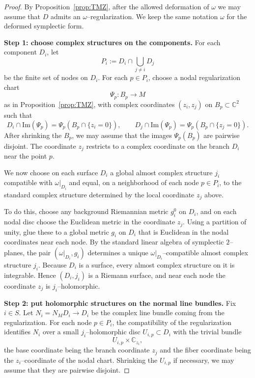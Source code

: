 \documentclass[11pt]{article}
\theoremstyle{remark}
\newcommand{\CC}{\mathbb{C}}
\begin{document}
\begin{proof}
By Proposition~\ref{prop:TMZ}, after the allowed deformation of $\omega$ we may assume
that $D$ admits an $\omega$--regularization.
We keep the same notation $\omega$ for the deformed symplectic form.

\medskip
\noindent\textbf{Step 1: choose complex structures on the components.}
For each component $D_i$, let
\[
P_i:= D_i\cap \bigcup_{j\neq i} D_j
\]
be the finite set of nodes on $D_i$.
For each $p\in P_i$, choose a nodal regularization chart
\[
\Psi_p\colon B_p\to M
\]
as in Proposition~\ref{prop:TMZ}, with complex coordinates $(z_i,z_j)$ on
$B_p\subset\CC^2$ such that
\[
D_i\cap \mathrm{Im}(\Psi_p)=\Psi_p(B_p\cap\{z_i=0\}),\qquad
D_j\cap \mathrm{Im}(\Psi_p)=\Psi_p(B_p\cap\{z_j=0\}).
\]
After shrinking the $B_p$, we may assume that the images $\Psi_p(B_p)$ are pairwise disjoint.
The coordinate $z_j$ restricts to a complex coordinate on the branch $D_i$
near the point $p$.

We now choose on each surface $D_i$ a global almost complex structure $j_i$
compatible with $\omega|_{D_i}$ and equal, on a neighborhood of each node
$p\in P_i$, to the standard complex structure determined by the local coordinate
$z_j$ above.

To do this, choose any background Riemannian metric $g_i^0$ on $D_i$, and on each
nodal disc choose the Euclidean metric in the coordinate $z_j$.
Using a partition of unity, glue these to a global metric $g_i$ on $D_i$ that is
Euclidean in the nodal coordinates near each node.
By the standard linear algebra of symplectic $2$--planes, the pair
$(\omega|_{D_i},g_i)$ determines a unique $\omega|_{D_i}$--compatible almost
complex structure $j_i$.
Because $D_i$ is a surface, every almost complex structure on it is integrable.
Hence $(D_i,j_i)$ is a Riemann surface, and near each node the coordinate $z_j$
is $j_i$--holomorphic.

\medskip
\noindent\textbf{Step 2: put holomorphic structures on the normal line bundles.}
Fix $i\in S$.
Let $N_i=N_M D_i\to D_i$ be the complex line bundle coming from the regularization.
For each node $p\in P_i$, the compatibility of the regularization identifies
$N_i$ over a small $j_i$--holomorphic disc $U_{i,p}\subset D_i$ with the trivial bundle
\[
U_{i,p}\times \CC_{z_i},
\]
the base coordinate being the branch coordinate $z_j$ and the fiber coordinate
being the $z_i$--coordinate of the nodal chart.
Shrinking the $U_{i,p}$ if necessary, we may assume that they are pairwise disjoint.


\end{proof}
\end{document}
